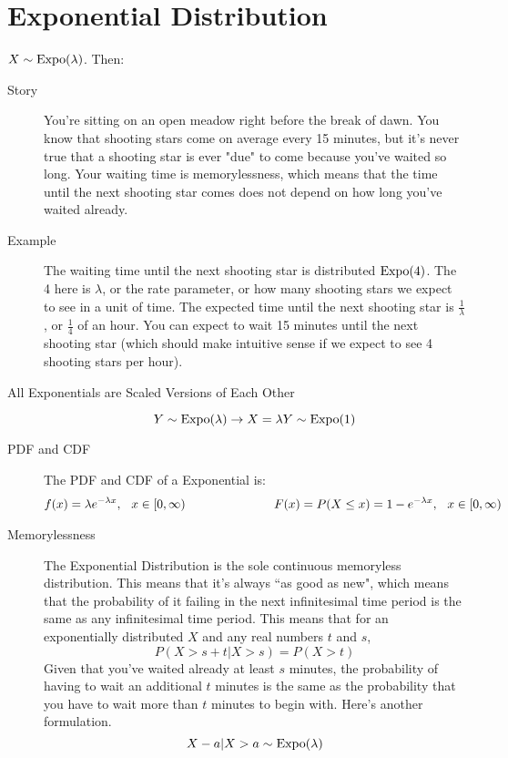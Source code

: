 \documentclass[11pt]{article}
\theoremstyle{definition}
\theoremstyle{remark}
\newcommand{\Expo}{\textnormal{Expo}}
\begin{document}
\section{Exponential Distribution}
\begin{description}
\item $X \sim \Expo(\lambda)$. Then:
\begin{description}
	\item[Story] You're sitting on an open meadow right before the break of dawn. You know that shooting stars come on average every 15 minutes, but it's never true that a shooting star is ever "due" to come because you've waited so long. Your waiting time is memorylessness, which means that the time until the next shooting star comes does not depend on how long you've waited already.
	
	\item[Example] The waiting time until the next shooting star is distributed $\Expo(4)$. The 4 here is $\lambda$, or the rate parameter, or how many shooting stars we expect to see in a unit of time. The expected time until the next shooting star is $\frac{1}{\lambda}$, or $\frac{1}{4}$ of an hour. You can expect to wait 15 minutes until the next shooting star (which should make intuitive sense if we expect to see 4 shooting stars per hour).
	
	\item[All Exponentials are Scaled Versions of Each Other]
		$$Y \sim \Expo(\lambda) \rightarrow X = \lambda Y \sim \Expo(1)$$
	 
	\item[PDF and CDF] The PDF and CDF of a Exponential is:
        \begin{eqnarray*}
        f(x) = \lambda e^{-\lambda x},
        \hspace{.1 in}
        x \in [0, \infty)
        \hspace{1 in}
        F(x) = P(X \leq x) = 1 - e^{-\lambda x},
        \hspace{.1 in}
        x \in [0, \infty)
        \end{eqnarray*}
	
	\item[Memorylessness] The Exponential Distribution is the sole continuous memoryless distribution. This means that it's always ``as good as new", which means that the probability of it failing in the next infinitesimal time period is the same as any infinitesimal time period. This means that for an exponentially distributed $X$ and any real numbers $t$ and $s$,
	$$P(X > s + t | X > s) = P(X > t)$$
	Given that you've waited already at least $s$ minutes, the probability of having to wait an additional $t$ minutes is the same as the probability that you have to wait more than $t$ minutes to begin with. Here's another formulation.
	$$X - a | X > a \sim \Expo(\lambda)$$
	

\end{description}
\end{description}
\end{document}
